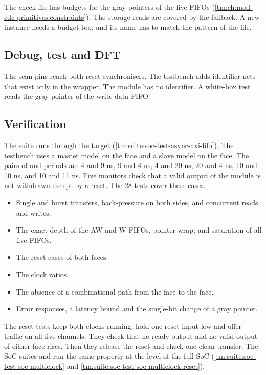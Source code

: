 The check file has budgets for the gray pointers of the five FIFOs (\cref{tm:ch:mod-cdc-primitives:constraints}). The storage reads are covered by the fallback. A new instance needs a budget too, and its name has to match the pattern of the file.

\subsection{Debug, test and DFT}
The scan pins reach both reset synchronisers. The testbench  adds identifier nets that exist only in the wrapper. The module has no identifier. A white-box test reads the gray pointer of the write data FIFO.

\subsection{Verification}
The suite  runs through the target  (\cref{tm:suite:soc-test-async-axi-fifo}). The testbench uses a master model on the  face and a slave model on the  face. The pairs of  and  periods are 4 and 9 ns, 9 and 4 ns, 4 and 20 ns, 20 and 4 ns, 10 and 10 ns, and 10 and 11 ns. Five monitors check that a valid output of the module is not withdrawn except by a reset. The 28 tests cover these cases.
\begin{itemize}
  \item Single and burst transfers, back-pressure on both sides, and concurrent reads and writes.
  \item The exact depth of the AW and W FIFOs, pointer wrap, and saturation of all five FIFOs.
  \item The reset cases of both faces.
  \item The clock ratios.
  \item The absence of a combinational path from the  face to the  face.
  \item Error responses, a latency bound and the single-bit change of a gray pointer.
\end{itemize}

The reset tests keep both clocks running, hold one reset input low and offer traffic on all five channels. They check that no ready output and no valid output of either face rises. Then they release the reset and check one clean transfer. The SoC suites  and  run the same property at the level of the full SoC (\cref{tm:suite:soc-test-soc-multiclock} and \cref{tm:suite:soc-test-soc-multiclock-reset}).

